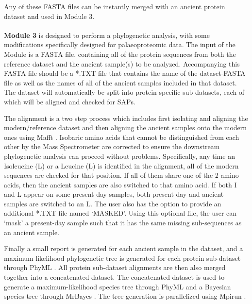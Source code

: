 \documentclass[twocolumn,showpacs,%
  nofootinbib,aps,superscriptaddress,%
  eqsecnum,prd,notitlepage,showkeys,10pt]{report}
\begin{document}
Any of these FASTA files can be instantly merged with an ancient protein dataset and used in Module 3.

\paragraph{}

\textbf{Module 3} is designed to perform a phylogenetic analysis, with some modifications specifically designed for palaeoproteomic data. The input of the Module is a FASTA file, containing all of the protein sequences from both the reference dataset and the ancient sample(s) to be analyzed. Accompanying this FASTA file should be a *.TXT file that contains the name of the dataset-FASTA file as well as the names of all of the ancient samples included in that dataset. The dataset will automatically be split into protein specific sub-datasets, each of which will be aligned and checked for SAPs. 

The alignment is a two step process which includes first isolating and aligning the modern/reference dataset and then aligning the ancient samples onto the modern ones using Mafft \cite{katoh2013mafft}. Isobaric amino acids that cannot be distinguished from each other by the Mass Spectrometer are corrected to ensure the downstream phylogenetic analysis can proceed without problems. Specifically, any time an Isoleucine (L) or a Leucine (L) is identified in the alignment, all of the modern sequences are checked for that position. If all of them share one of the 2 amino acids, then the ancient samples are also switched to that amino acid. If both I and L appear on some present-day samples, both present-day and ancient samples are switched to an L. The user also has the option to provide an additional *.TXT file named ‘MASKED’. Using this optional file, the user can ‘mask’ a present-day sample such that it has the same missing sub-sequences as an ancient sample. 

Finally a small report is generated for each ancient sample in the dataset, and a maximum likelihood phylogenetic tree is generated for each protein sub-dataset through PhyML \cite{guindon2010new}. All protein sub-dataset alignments are then also merged together into a concatenated dataset. The concatenated dataset is used to generate a maximum-likelihood species tree \cite{felsenstein1981evolutionary} through PhyML and a Bayesian species tree \cite{rannala1996probability,mau1997phylogenetic} through MrBayes \cite{huelsenbeck2001mrbayes}.  The tree generation is parallelized using Mpirun \cite{mpi40}.
\end{document}
